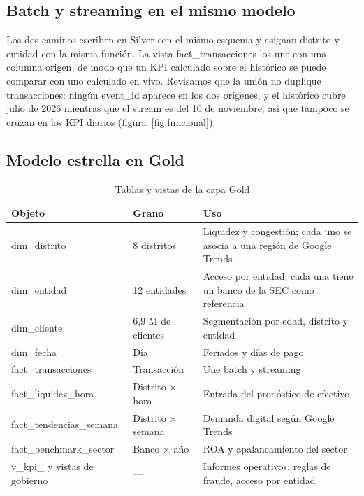 \documentclass[11pt,a4paper]{article}
\DeclareRobustCommand{\cod}[1]{{\small\ttfamily\codbreaks #1}}
\DeclareRobustCommand{\codbreaks}{\let\oldus\_\renewcommand{\_}{\oldus\allowbreak}}
\begin{document}
\subsection{Batch y streaming en el mismo modelo}

Los dos caminos escriben en Silver con el mismo esquema y asignan distrito y entidad con la misma función. La vista \cod{fact\_transacciones} los une con una columna \cod{origen}, de modo que un KPI calculado sobre el histórico se puede comparar con uno calculado en vivo. Revisamos que la unión no duplique transacciones: ningún \cod{event\_id} aparece en los dos orígenes, y el histórico cubre julio de 2026 mientras que el stream es del 10 de noviembre, así que tampoco se cruzan en los KPI diarios (figura~\ref{fig:funcional}).

\subsection{Modelo estrella en Gold}

\begin{table}[H]
\centering\small
\caption{Tablas y vistas de la capa Gold}
\label{tab:gold}
\begin{tabularx}{\linewidth}{P{4.2cm}P{3.3cm}L}
\toprule
\textbf{Objeto} & \textbf{Grano} & \textbf{Uso}\\
\midrule
\cod{dim\_distrito} & 8 distritos & Liquidez y congestión; cada uno se asocia a una región de Google Trends\\
 \cod{dim\_entidad} & 12 entidades & Acceso por entidad; cada una tiene un banco de la SEC como referencia\\
\cod{dim\_cliente} & 6,9 M de clientes & Segmentación por edad, distrito y entidad\\
 \cod{dim\_fecha} & Día & Feriados y días de pago\\
\cod{fact\_transacciones} & Transacción & Une batch y streaming\\
 \cod{fact\_liquidez\_hora} & Distrito × hora & Entrada del pronóstico de efectivo\\
\cod{fact\_tendencias\_semana} & Distrito × semana & Demanda digital según Google Trends\\
 \cod{fact\_benchmark\_sector} & Banco × año & ROA y apalancamiento del sector\\
\cod{v\_kpi\_*} y vistas de gobierno & — & Informes operativos, reglas de fraude, acceso por entidad\\
\bottomrule
\end{tabularx}
\end{table}
\end{document}
